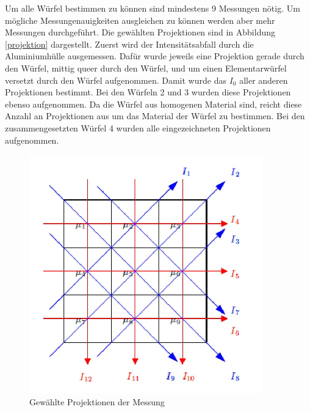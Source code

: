 Um alle Würfel bestimmen zu können sind mindestens 9 Messungen nötig. Um mögliche Messungenauigkeiten ausgleichen zu können werden aber mehr Messungen durchgeführt. Die gewählten Projektionen sind in Abbildung \ref{projektion} dargestellt. 
Zuerst wird der Intensitätsabfall durch die Aluminiumhülle ausgemessen. Dafür wurde jeweils eine Projektion gerade durch den Würfel, mittig queer durch den Würfel, und um einen Elementarwürfel versetzt durch den Würfel aufgenommen. Damit wurde das $I_0$ aller anderen Projektionen bestimmt.
Bei den Würfeln 2 und 3 wurden diese Projektionen ebenso aufgenommen. Da die Würfel aus homogenen Material sind, reicht diese Anzahl an Projektionen aus um das Material der Würfel zu bestimmen.
Bei den zusammengesetzten Würfel 4 wurden alle eingezeichneten Projektionen aufgenommen.

\begin{figure}
    \centering
    \includegraphics[width=0.9\textwidth]{content/projektion.JPG}
    \caption{Gewählte Projektionen der Messung}
    \label{fig:Aufbau2}
  \end{figure}

